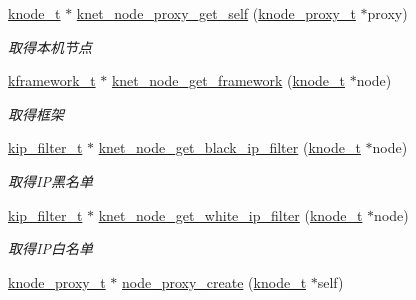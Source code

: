 \begin{DoxyCompactItemize}
\hyperlink{a00066_a5e720b27efbc9ad744240f5f4233763a_a5e720b27efbc9ad744240f5f4233763a}{knode\+\_\+t} $\ast$ \hyperlink{a00135_ga1cc9cde586994397081f6e28f8c40ace_ga1cc9cde586994397081f6e28f8c40ace}{knet\+\_\+node\+\_\+proxy\+\_\+get\+\_\+self} (\hyperlink{a00066_a5025c3e4422f5f55b981aad6e56b6d89_a5025c3e4422f5f55b981aad6e56b6d89}{knode\+\_\+proxy\+\_\+t} $\ast$proxy)
\begin{DoxyCompactList}\small\item\em 取得本机节点 \end{DoxyCompactList}\item 
\hyperlink{a00066_a3195a3be35782fc1efb920c811be111d_a3195a3be35782fc1efb920c811be111d}{kframework\+\_\+t} $\ast$ \hyperlink{a00135_ga8cdcfd95182d97a0edd16d5c47adec51_ga8cdcfd95182d97a0edd16d5c47adec51}{knet\+\_\+node\+\_\+get\+\_\+framework} (\hyperlink{a00066_a5e720b27efbc9ad744240f5f4233763a_a5e720b27efbc9ad744240f5f4233763a}{knode\+\_\+t} $\ast$node)
\begin{DoxyCompactList}\small\item\em 取得框架 \end{DoxyCompactList}\item 
\hyperlink{a00066_a1c0c604eecd86fc8895cf4bbbba566af_a1c0c604eecd86fc8895cf4bbbba566af}{kip\+\_\+filter\+\_\+t} $\ast$ \hyperlink{a00135_ga41687a31d6d8d2ea196c628301d1bb2c_ga41687a31d6d8d2ea196c628301d1bb2c}{knet\+\_\+node\+\_\+get\+\_\+black\+\_\+ip\+\_\+filter} (\hyperlink{a00066_a5e720b27efbc9ad744240f5f4233763a_a5e720b27efbc9ad744240f5f4233763a}{knode\+\_\+t} $\ast$node)
\begin{DoxyCompactList}\small\item\em 取得\+I\+P黑名单 \end{DoxyCompactList}\item 
\hyperlink{a00066_a1c0c604eecd86fc8895cf4bbbba566af_a1c0c604eecd86fc8895cf4bbbba566af}{kip\+\_\+filter\+\_\+t} $\ast$ \hyperlink{a00135_ga41321abe67ec5ab6ff96a8b5ef29cb3d_ga41321abe67ec5ab6ff96a8b5ef29cb3d}{knet\+\_\+node\+\_\+get\+\_\+white\+\_\+ip\+\_\+filter} (\hyperlink{a00066_a5e720b27efbc9ad744240f5f4233763a_a5e720b27efbc9ad744240f5f4233763a}{knode\+\_\+t} $\ast$node)
\begin{DoxyCompactList}\small\item\em 取得\+I\+P白名单 \end{DoxyCompactList}\item 
\hyperlink{a00066_a5025c3e4422f5f55b981aad6e56b6d89_a5025c3e4422f5f55b981aad6e56b6d89}{knode\+\_\+proxy\+\_\+t} $\ast$ \hyperlink{a00101_ab454c97d2a6363ac5f69e954bad84992_ab454c97d2a6363ac5f69e954bad84992}{node\+\_\+proxy\+\_\+create} (\hyperlink{a00066_a5e720b27efbc9ad744240f5f4233763a_a5e720b27efbc9ad744240f5f4233763a}{knode\+\_\+t} $\ast$self)

\end{DoxyCompactItemize}
